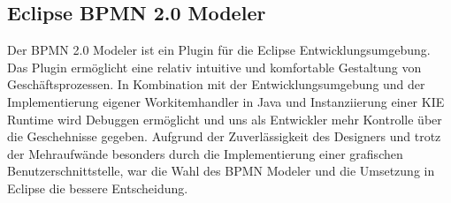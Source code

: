 \subsection{Eclipse BPMN 2.0 Modeler}
Der BPMN 2.0 Modeler ist ein Plugin für die Eclipse Entwicklungsumgebung. Das Plugin ermöglicht eine relativ intuitive und komfortable Gestaltung von Geschäftsprozessen. In Kombination mit der Entwicklungsumgebung und der Implementierung eigener Workitemhandler in Java und Instanziierung einer KIE Runtime wird Debuggen ermöglicht und uns als Entwickler mehr Kontrolle über die Geschehnisse gegeben. Aufgrund der Zuverlässigkeit des Designers und trotz der Mehraufwände besonders durch die Implementierung einer grafischen Benutzerschnittstelle, war die Wahl des BPMN Modeler und die Umsetzung in Eclipse die bessere Entscheidung. 
